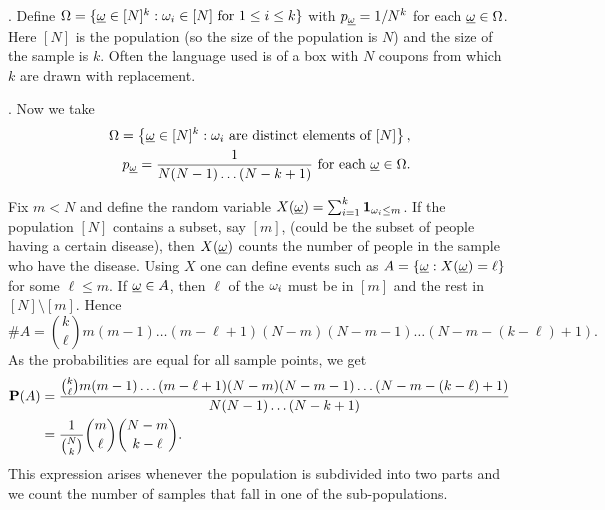\documentclass[preprint,  11pt]{amsart}
\def\omeg{\underline{\ome}}
\begin{document}
\beg {}. Define $\Ome=\{\omeg\in [N]^{k}\suchthat \ome_{i}\in [N] \mb{ for }1\le i\le k\}$ with $p_{\omeg}=1/N^{k}$ for each $\omeg\in \Ome$. Here $[N]$ is the population (so the size of the population is $N$) and the size of the sample is $k$. Often the language used is of a box with $N$ coupons from which $k$ are drawn with replacement.
\eeg

\beg {}. Now we take
\begin{align*}
\Ome=\l\{\omeg\in [N]^{k}\suchthat \ome_{i}\mb{ are distinct elements of } [N]\r\}, \\
p_{\omeg}=\frac{1}{N(N-1)\ldots (N-k+1)}  \mb{ for each }\omeg\in \Ome.
\end{align*}

Fix $m<N$ and define the random variable $X(\omeg)=\sum_{i=1}^{k}\one_{\ome_{i}\le m}$. If the population $[N]$ contains a subset, say $[m]$, (could be the subset of people having a certain disease), then $X(\omeg)$ counts the number of people in the sample who have the disease. Using $X$ one can define  events such as $A=\{\omeg\suchthat X(\omeg)=\ell\}$ for some $\ell\le m$. If $\omeg\in A$, then $\ell$ of the $\ome_{i}$ must be in $[m]$ and the rest in $[N]\setminus [m]$. Hence $$\#A=\binom{k}{\ell}m(m-1)\ldots (m-\ell+1)(N-m)(N-m-1)\ldots (N-m-(k-\ell)+1).$$
As the probabilities are equal for all sample points, we get
\begin{align*}
\P(A)&= \frac{\binom{k}{\ell}m(m-1)\ldots (m-\ell+1)(N-m)(N-m-1)\ldots (N-m-(k-\ell)+1)}{N(N-1)\ldots (N-k+1)} \\
 &= \frac{1}{\binom{N}{k}}\binom{m}{\ell}\binom{N-m}{k-\ell}.
\end{align*}
This expression arises whenever the population is subdivided into two parts and we count the number of samples that fall in one of the sub-populations.
\eeg
\end{document}
